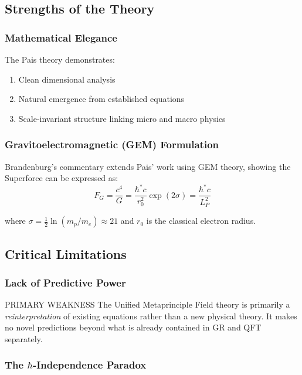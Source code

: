 \subsection{Strengths of the Theory}

\subsubsection{Mathematical Elegance}

The Pais theory demonstrates:
\begin{enumerate}
\item Clean dimensional analysis
\item Natural emergence from established equations
\item Scale-invariant structure linking micro and macro physics
\end{enumerate}

\subsubsection{Gravitoelectromagnetic (GEM) Formulation}

Brandenburg's commentary extends Pais' work using GEM theory, showing the Superforce can be expressed as:
\begin{equation}
F_G = \frac{c^4}{G} = \frac{\hbar^* c}{r_0^2} \exp(2\sigma) = \frac{\hbar^* c}{L_P^2}
\end{equation}

where $\sigma = \frac{1}{2}\ln(m_p/m_e) \approx 21$ and $r_0$ is the classical electron radius.

\subsection{Critical Limitations}

\subsubsection{Lack of Predictive Power}

\begin{factcheck}{PRIMARY WEAKNESS}
The Unified Metaprinciple Field theory is primarily a \textit{reinterpretation} of existing equations rather than a new physical theory. It makes no novel predictions beyond what is already contained in GR and QFT separately.
\end{factcheck}

\subsubsection{The $\hbar$-Independence Paradox}

